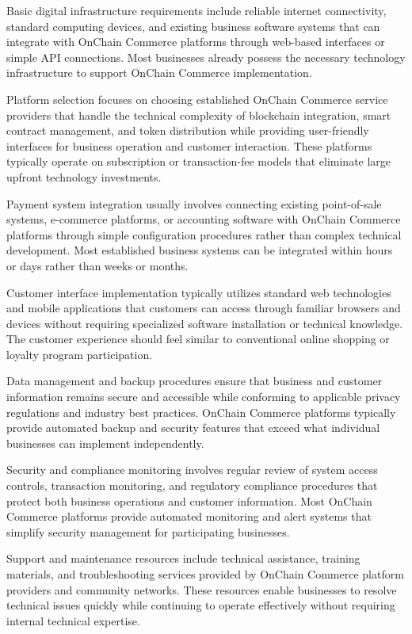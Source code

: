\documentclass[
  Letterpaper,
]{scrbook}
\begin{document}
Basic digital infrastructure requirements include reliable internet
connectivity, standard computing devices, and existing business software
systems that can integrate with OnChain Commerce platforms through
web-based interfaces or simple API connections. Most businesses already
possess the necessary technology infrastructure to support OnChain
Commerce implementation.

Platform selection focuses on choosing established OnChain Commerce
service providers that handle the technical complexity of blockchain
integration, smart contract management, and token distribution while
providing user-friendly interfaces for business operation and customer
interaction. These platforms typically operate on subscription or
transaction-fee models that eliminate large upfront technology
investments.

Payment system integration usually involves connecting existing
point-of-sale systems, e-commerce platforms, or accounting software with
OnChain Commerce platforms through simple configuration procedures
rather than complex technical development. Most established business
systems can be integrated within hours or days rather than weeks or
months.

Customer interface implementation typically utilizes standard web
technologies and mobile applications that customers can access through
familiar browsers and devices without requiring specialized software
installation or technical knowledge. The customer experience should feel
similar to conventional online shopping or loyalty program
participation.

Data management and backup procedures ensure that business and customer
information remains secure and accessible while conforming to applicable
privacy regulations and industry best practices. OnChain Commerce
platforms typically provide automated backup and security features that
exceed what individual businesses can implement independently.

Security and compliance monitoring involves regular review of system
access controls, transaction monitoring, and regulatory compliance
procedures that protect both business operations and customer
information. Most OnChain Commerce platforms provide automated
monitoring and alert systems that simplify security management for
participating businesses.

Support and maintenance resources include technical assistance, training
materials, and troubleshooting services provided by OnChain Commerce
platform providers and community networks. These resources enable
businesses to resolve technical issues quickly while continuing to
operate effectively without requiring internal technical expertise.
\end{document}
